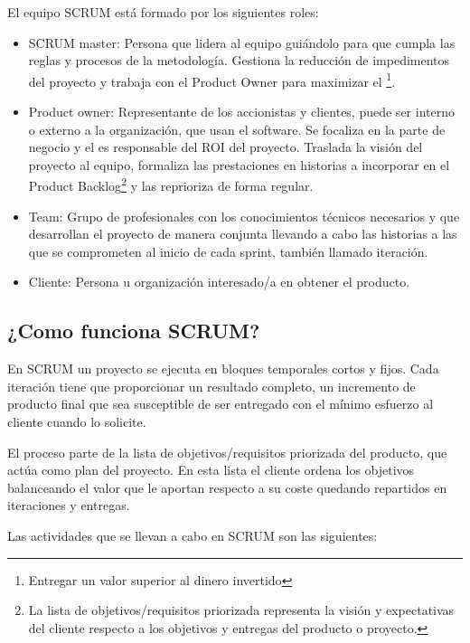 El equipo SCRUM está formado por los siguientes roles:
\begin{itemize}
\item SCRUM master: Persona que lidera al equipo guiándolo para que cumpla las reglas y procesos de la metodología. Gestiona la reducción de impedimentos del proyecto y trabaja con el Product Owner para maximizar el \footnote{Entregar un valor superior al dinero invertido}.
\item Product owner: Representante de los accionistas y clientes, puede ser interno o externo a la organización, que usan el software. Se focaliza en la parte de negocio y el es responsable del \ac{ROI} del proyecto. Traslada la visión del proyecto al equipo, formaliza las prestaciones en historias a incorporar en el Product Backlog\footnote{La lista de objetivos/requisitos priorizada representa la visión y expectativas del cliente respecto a los objetivos y entregas del producto o proyecto.} y las reprioriza de forma regular.
\item Team: Grupo de profesionales con los conocimientos técnicos necesarios y que desarrollan el proyecto de manera conjunta llevando a cabo las historias a las que se comprometen al inicio de cada sprint, también llamado iteración.
\item Cliente: Persona u organización interesado/a en obtener el producto.
\end{itemize}

\subsection{¿Como funciona SCRUM?}

En SCRUM un proyecto se ejecuta en bloques temporales cortos y fijos. Cada iteración tiene que proporcionar un resultado completo, un incremento de producto final que sea susceptible de ser entregado con el mínimo esfuerzo al cliente cuando lo solicite.

El proceso parte de la lista de objetivos/requisitos priorizada del producto, que actúa como plan del proyecto. En esta lista el cliente ordena los objetivos balanceando el valor que le aportan respecto a su coste quedando repartidos en iteraciones y entregas.

Las actividades que se llevan a cabo en SCRUM son las siguientes:


